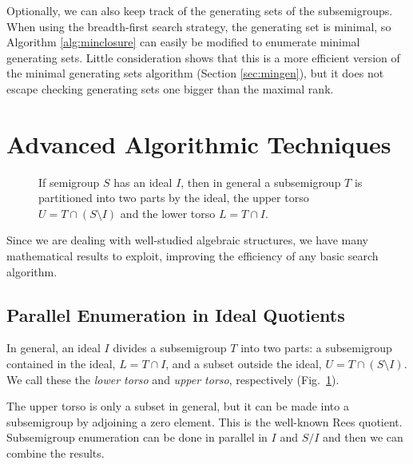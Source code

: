 \documentclass{amsart}
\newcommand{\todo}[1]{\textcolor{red}{ \small \textsf{[ #1 ]} \normalsize}}
\theoremstyle{plain}
\theoremstyle{definition}
\begin{document}
Optionally, we can also keep track of the generating sets of the subsemigroups.
When using the breadth-first search strategy, the generating set is minimal, so Algorithm \ref{alg:minclosure} can easily be modified to enumerate minimal generating sets.
Little consideration shows that this is a more efficient version of the minimal generating sets algorithm (Section \ref{sec:mingen}), but it does not escape checking generating sets one bigger than the maximal rank.


\section{Advanced Algorithmic Techniques}
\label{sec:techniques}

\begin{figure}[t]
\begin{center}

\caption{If semigroup $S$ has an ideal $I$, then in general a subsemigroup $T$ is partitioned into two parts by the ideal, the upper torso $U=T\cap (S\setminus I)$ and the lower torso $L=T\cap I$.}
\label{fig:torsos}
\end{center}
\end{figure}

Since we are dealing with well-studied algebraic structures, we have many mathematical results to exploit, improving the efficiency of any basic search algorithm.
\subsection{Parallel Enumeration in Ideal Quotients}
\label{sec:idealparallel}
In general, an ideal $I$ divides a subsemigroup $T$ into two parts: a subsemigroup contained in the ideal, $L=T\cap I$, and a subset outside the ideal, $U=T\cap (S\setminus I)$. We call these the \emph{lower torso} and \emph{upper torso}, respectively (Fig.\ \ref{fig:torsos}).

The upper torso is only a subset in general, but it can be made into a subsemigroup by adjoining a zero element. This is the well-known Rees quotient. 
Subsemigroup enumeration can be done in parallel in $I$ and $S/I$  and then  we can combine the results.
\end{document}
